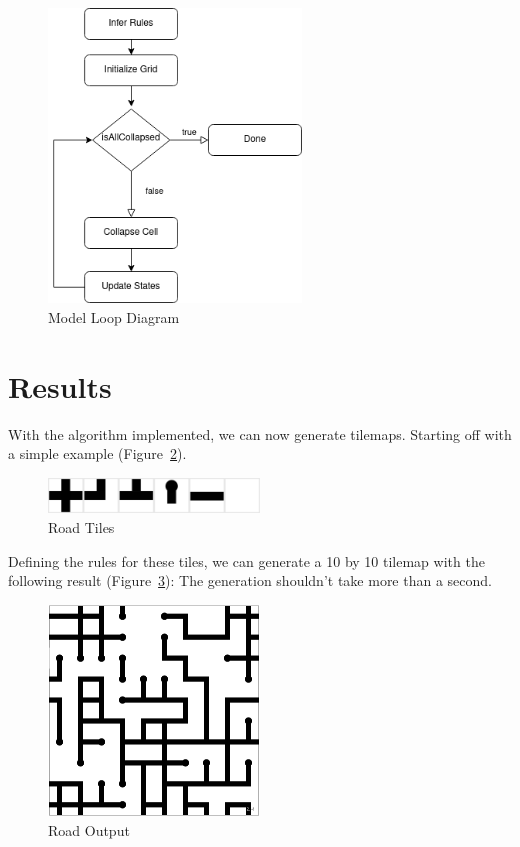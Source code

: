 \documentclass[10pt,oneside,a4paper]{article}
\begin{document}
\begin{figure}[ht]
    \centering
    \includegraphics[width=0.6\textwidth]{figures/model_loop_diagram.png}
    \caption{Model Loop Diagram}\label{fig:model_loop_diagram}
\end{figure}


\section{Results}\label{sec:results}
With the algorithm implemented, we can now generate tilemaps.
Starting off with a simple example (Figure~\ref{fig:example1}).
\begin{figure}[ht]
    \centering
    \includegraphics[width=0.5\textwidth]{figures/road_tiles.png}
    \caption{Road Tiles}\label{fig:example1}
\end{figure}

Defining the rules for these tiles, we can generate a 10 by 10 tilemap with the following result (Figure~\ref{fig:example1map}):
The generation shouldn't take more than a second.

\begin{figure}[ht]
    \centering
    \includegraphics[width=0.5\textwidth]{figures/roads_output.png}
    \caption{Road Output}\label{fig:example1map}
\end{figure}
\end{document}
